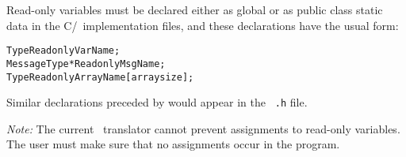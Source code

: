 Read-only variables must be declared either as global or as public class static
data in the C/\CC\ implementation files, and these declarations have the usual
form:

\begin{alltt}
 Type ReadonlyVarName;
 MessageType *ReadonlyMsgName;
 Type ReadonlyArrayName [arraysize];
\end{alltt}

Similar declarations preceded by  would appear in the {\tt
.h} file. 

{\it Note:}  The current \charmpp\ translator cannot prevent
assignments to read-only variables.  The user must make sure that no
assignments occur in the program.

